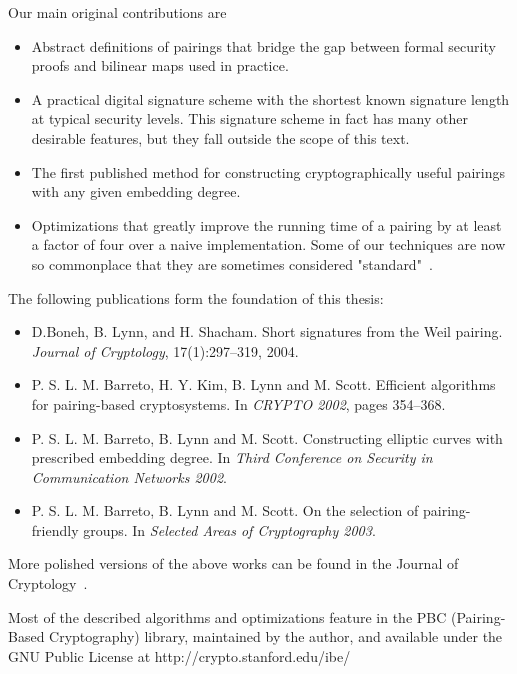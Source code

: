 Our main original contributions are
\begin{itemize}
\item Abstract definitions of pairings that bridge the
gap between formal security proofs and bilinear maps used in practice.
\item A practical digital signature scheme with the shortest known
signature length at typical security levels. This signature scheme
in fact has many other desirable features, but they fall outside the scope
of this text.
\item The first published method for constructing cryptographically
useful pairings with any given embedding degree.
\item Optimizations that greatly improve the running time of a pairing
by at least a factor of four over a naive implementation. Some of our
techniques are now so commonplace that they are
sometimes considered "standard"~\cite{hsv}.
\end{itemize}

The following publications
form the foundation of this thesis:
\begin{itemize}
\item D.Boneh, B. Lynn, and H. Shacham. Short signatures from the Weil pairing.
{\it Journal of Cryptology}, 17(1):297--319, 2004.
\item
P. S. L. M. Barreto, H. Y. Kim, B. Lynn and M. Scott.
Efficient algorithms for pairing-based cryptosystems. In {\it CRYPTO 2002},
pages 354--368.
\item P. S. L. M. Barreto, B. Lynn and M. Scott.
Constructing elliptic curves with prescribed embedding degree. In {\it Third
Conference on Security in Communication Networks 2002}.
\item P. S. L. M. Barreto, B. Lynn and M. Scott.
On the selection of pairing-friendly groups. In {\it Selected Areas of Cryptography 2003}.
\end{itemize}
More polished versions of the above works can be found
in the Journal of Cryptology~\cite{blsjournal, balsjournal}.

Most of the described algorithms and optimizations
feature in the PBC (Pairing-Based Cryptography) library, maintained by the
author, and available under the GNU Public License at 
http://crypto.stanford.edu/ibe/
